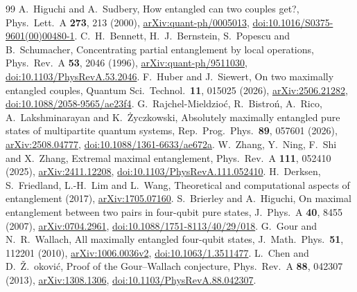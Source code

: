 \documentclass[11pt]{article}
\begin{document}


\begin{thebibliography}{99}
 A.~Higuchi and A.~Sudbery, How entangled can two couples get?, Phys.\ Lett.\ A
\textbf{273}, 213 (2000), \href{https://arxiv.org/abs/quant-ph/0005013}{arXiv:quant-ph/0005013}, \href{https://doi.org/10.1016/S0375-9601(00)00480-1}{doi:10.1016/S0375-9601(00)00480-1}.
 C.~H.~Bennett, H.~J.~Bernstein, S.~Popescu and B.~Schumacher, Concentrating partial entanglement by
local operations, Phys.\ Rev.\ A \textbf{53}, 2046 (1996), \href{https://arxiv.org/abs/quant-ph/9511030}{arXiv:quant-ph/9511030}, \href{https://doi.org/10.1103/PhysRevA.53.2046}{doi:10.1103/PhysRevA.53.2046}.
 F.~Huber and J.~Siewert, On two maximally entangled couples, Quantum Sci.\ Technol.\ \textbf{11},
015025 (2026), \href{https://arxiv.org/abs/2506.21282}{arXiv:2506.21282}, \href{https://doi.org/10.1088/2058-9565/ae23f4}{doi:10.1088/2058-9565/ae23f4}.
 G.~Rajchel-Mieldzio\'c, R.~Bistro\'n, A.~Rico, A.~Lakshminarayan and K.~\.Zyczkowski, Absolutely
maximally entangled pure states of multipartite quantum systems, Rep.\ Prog.\ Phys.\ \textbf{89}, 057601 (2026),
\href{https://arxiv.org/abs/2508.04777}{arXiv:2508.04777}, \href{https://doi.org/10.1088/1361-6633/ae672a}{doi:10.1088/1361-6633/ae672a}.
 W.~Zhang, Y.~Ning, F.~Shi and X.~Zhang, Extremal maximal entanglement, Phys.\ Rev.\ A \textbf{111}, 052410 (2025),
\href{https://arxiv.org/abs/2411.12208}{arXiv:2411.12208}, \href{https://doi.org/10.1103/PhysRevA.111.052410}{doi:10.1103/PhysRevA.111.052410}.
 H.~Derksen, S.~Friedland, L.-H.~Lim and L.~Wang, Theoretical and computational aspects of entanglement
(2017), \href{https://arxiv.org/abs/1705.07160}{arXiv:1705.07160}.
 S.~Brierley and A.~Higuchi, On maximal entanglement between two pairs in four-qubit
pure states, J.\ Phys.\ A \textbf{40}, 8455 (2007), \href{https://arxiv.org/abs/0704.2961}{arXiv:0704.2961}, \href{https://doi.org/10.1088/1751-8113/40/29/018}{doi:10.1088/1751-8113/40/29/018}.
 G.~Gour and N.~R.~Wallach, All maximally entangled four-qubit states, J.\ Math.\ Phys.\
\textbf{51}, 112201 (2010), \href{https://arxiv.org/abs/1006.0036}{arXiv:1006.0036v2}, \href{https://doi.org/10.1063/1.3511477}{doi:10.1063/1.3511477}.
\bibitem{CD} L.~Chen and D.~\v{Z}.~\DJ{}okovi\'c, Proof of the Gour--Wallach conjecture, Phys.\ Rev.\ A
\textbf{88}, 042307 (2013), \href{https://arxiv.org/abs/1308.1306}{arXiv:1308.1306}, \href{https://doi.org/10.1103/PhysRevA.88.042307}{doi:10.1103/PhysRevA.88.042307}.

\end{thebibliography}
\end{document}
